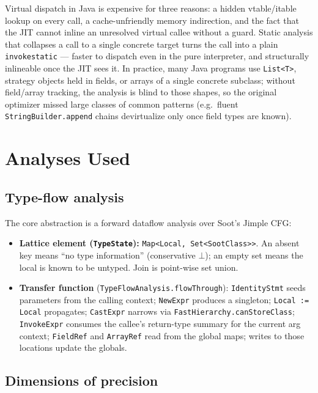 \documentclass[11pt,a4paper]{article}
\begin{document}
Virtual dispatch in Java is expensive for three reasons: a hidden
vtable/itable lookup on every call, a cache-unfriendly memory
indirection, and the fact that the JIT cannot inline an unresolved
virtual callee without a guard. Static analysis that collapses a call to
a single concrete target turns the call into a plain \texttt{invokestatic}
--- faster to dispatch even in the pure interpreter, and structurally
inlineable once the JIT sees it. In practice, many Java programs use
\texttt{List<T>}, strategy objects held in fields, or arrays of a single
concrete subclass; without field/array tracking, the analysis is blind to
those shapes, so the original optimizer missed large classes of common
patterns (e.g.\ fluent \texttt{StringBuilder.append} chains devirtualize
only once field types are known).

\section{Analyses Used}

\subsection*{Type-flow analysis}

The core abstraction is a forward dataflow analysis over Soot's Jimple
CFG:

\begin{itemize}[topsep=2pt,itemsep=0pt]
  \item \textbf{Lattice element (\texttt{TypeState}):}
    \texttt{Map<Local, Set<SootClass>>}. An absent key means ``no type
    information'' (conservative $\bot$); an empty set means the local is
    known to be untyped. Join is point-wise set union.
  \item \textbf{Transfer function} (\texttt{TypeFlowAnalysis.flowThrough}):
    \texttt{IdentityStmt} seeds parameters from the calling context;
    \texttt{NewExpr} produces a singleton; \texttt{Local := Local}
    propagates; \texttt{CastExpr} narrows via
    \texttt{FastHierarchy.canStoreClass}; \texttt{InvokeExpr} consumes the
    callee's return-type summary for the current arg context;
    \texttt{FieldRef} and \texttt{ArrayRef} read from the global maps;
    writes to those locations update the globals.
\end{itemize}

\subsection*{Dimensions of precision}
\end{document}
